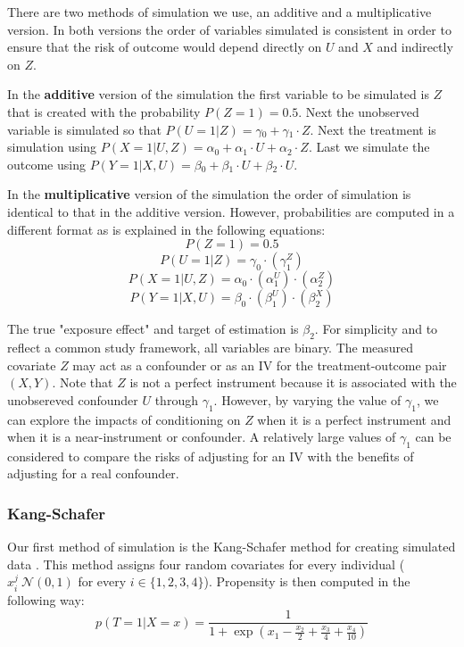 \documentclass{article}
\begin{document}
There are two methods of simulation we use, an additive and a multiplicative version. In both versions the order of variables simulated is consistent in order to ensure that the risk of outcome would depend directly on $U$ and $X$ and indirectly on $Z$.

In the \textbf{additive} version of the simulation the first variable to be simulated is $Z$ that is created with the probability $P(Z=1)=0.5$.
Next the unobserved variable is simulated so that $P(U=1|Z)=\gamma{}_0 + \gamma{}_1\cdot{}Z$. Next the treatment is simulation using $P(X=1|U,Z) = \alpha{}_0 + \alpha{}_1 \cdot{} U + \alpha{}_2 \cdot{} Z$. Last we simulate the outcome using $P(Y=1|X,U) = \beta{}_0 + \beta{}_1 \cdot{} U + \beta{}_2 \cdot{} U$. 

In the \textbf{multiplicative} version of the simulation the order of simulation is identical to that in the additive version. However, probabilities are computed in a different format as is explained in the following equations:
$$P(Z=1)=0.5$$
$$P(U=1|Z)=\gamma_0\cdot{}(\gamma_1^Z)$$
$$P(X=1|U,Z)= \alpha_0\cdot(\alpha_1^U)\cdot(\alpha_2^Z)$$
$$P(Y=1|X,U) = \beta_0 \cdot (\beta_1^U) \cdot (\beta_2^X)$$

The true "exposure effect" and target of estimation is $\beta_2$. 
For simplicity and to reflect a common study framework, all variables are binary.
The measured covariate $Z$ may act as a confounder or as an IV for the treatment-outcome pair $(X, Y)$.
Note that $Z$ is not a perfect instrument because it is associated with the unobsereved confounder $U$ through $\gamma_1$. 
However, by varying the value of $\gamma_1$, we can explore the impacts of conditioning on $Z$ when it is a perfect instrument and when it is a near-instrument or confounder.
A relatively large values of $\gamma_1$ can be considered to compare the risks of adjusting for an IV with the benefits of adjusting for a real confounder.

\subsubsection{Kang-Schafer}
Our first method of simulation is the Kang-Schafer method for creating simulated data \cite{kang2007demystifying}. This method assigns four random covariates for every individual ($x_i^j~\mathcal{N}(0,1)$ for every $i\in{}\{1,2,3,4\}$). 
Propensity is then computed in the following way:
\begin{equation*}
    p(T=1| X=x) = \frac{1}{1 + \exp{(x_1 - \frac{x_2}{2} + \frac{x_3}{4} + \frac{x_4}{10})}}
\end{equation*}
\end{document}

